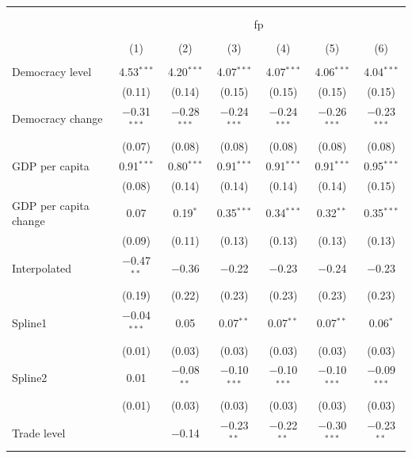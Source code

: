 \documentclass[12pt,a4paper]{article}\usepackage[]{graphicx}\usepackage[]{color}
\begin{document}
\begin{table}[!htbp] \centering 
  \caption{} 
  \label{} 
\small 
\begin{tabular}{@{\extracolsep{5pt}}lcccccc} 
\\[-1.8ex]\hline \\[-1.8ex] 
\\[-1.8ex] & \multicolumn{6}{c}{fp} \\ 
\\[-1.8ex] & (1) & (2) & (3) & (4) & (5) & (6)\\ 
\hline \\[-1.8ex] 
 Democracy level & 4.53$^{***}$ & 4.20$^{***}$ & 4.07$^{***}$ & 4.07$^{***}$ & 4.06$^{***}$ & 4.04$^{***}$ \\ 
  & (0.11) & (0.14) & (0.15) & (0.15) & (0.15) & (0.15) \\ 
  Democracy change & $-$0.31$^{***}$ & $-$0.28$^{***}$ & $-$0.24$^{***}$ & $-$0.24$^{***}$ & $-$0.26$^{***}$ & $-$0.23$^{***}$ \\ 
  & (0.07) & (0.08) & (0.08) & (0.08) & (0.08) & (0.08) \\ 
  GDP per capita & 0.91$^{***}$ & 0.80$^{***}$ & 0.91$^{***}$ & 0.91$^{***}$ & 0.91$^{***}$ & 0.95$^{***}$ \\ 
  & (0.08) & (0.14) & (0.14) & (0.14) & (0.14) & (0.15) \\ 
  GDP per capita change & 0.07 & 0.19$^{*}$ & 0.35$^{***}$ & 0.34$^{***}$ & 0.32$^{**}$ & 0.35$^{***}$ \\ 
  & (0.09) & (0.11) & (0.13) & (0.13) & (0.13) & (0.13) \\ 
  Interpolated & $-$0.47$^{**}$ & $-$0.36 & $-$0.22 & $-$0.23 & $-$0.24 & $-$0.23 \\ 
  & (0.19) & (0.22) & (0.23) & (0.23) & (0.23) & (0.23) \\ 
  Spline1 & $-$0.04$^{***}$ & 0.05 & 0.07$^{**}$ & 0.07$^{**}$ & 0.07$^{**}$ & 0.06$^{*}$ \\ 
  & (0.01) & (0.03) & (0.03) & (0.03) & (0.03) & (0.03) \\ 
  Spline2 & 0.01 & $-$0.08$^{**}$ & $-$0.10$^{***}$ & $-$0.10$^{***}$ & $-$0.10$^{***}$ & $-$0.09$^{***}$ \\ 
  & (0.01) & (0.03) & (0.03) & (0.03) & (0.03) & (0.03) \\ 
  Trade level &  & $-$0.14 & $-$0.23$^{**}$ & $-$0.22$^{**}$ & $-$0.30$^{***}$ & $-$0.23$^{**}$ \\ 

\end{tabular}
\end{table}
\end{document}
